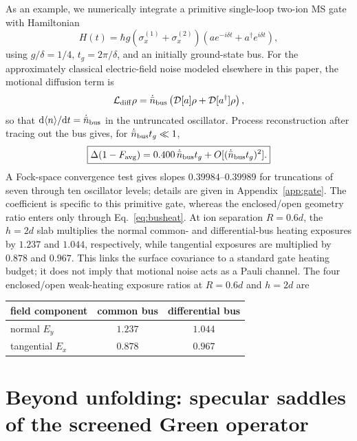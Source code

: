 \documentclass[aps,pra,twocolumn,superscriptaddress,longbibliography,nofootinbib,floatfix]{revtex4-2}
\theoremstyle{remark}
\newcommand{\dd}{\mathrm d}
\begin{document}
As an example, we numerically integrate a primitive single-loop two-ion MS gate with Hamiltonian
\begin{equation}
H(t)=\hbar g(\sigma_x^{(1)}+\sigma_x^{(2)})
(ae^{-i\delta t}+a^\dagger e^{i\delta t}),
\end{equation}
using $g/\delta=1/4$, $t_g=2\pi/\delta$, and an initially ground-state bus.  For the approximately classical electric-field noise modeled elsewhere in this paper, the motional diffusion term is
\begin{equation}
\mathcal L_{\rm diff}\rho=\dot{\bar n}_{\rm bus}
\left(\mathcal D[a]\rho+\mathcal D[a^\dagger]\rho\right),
\end{equation}
so that $\dd\langle n\rangle/\dd t=\dot{\bar n}_{\rm bus}$ in the untruncated oscillator.  Process reconstruction after tracing out the bus gives, for $\dot{\bar n}_{\rm bus}t_g\ll1$,
\begin{equation}
\boxed{\Delta(1-F_{\rm avg})=0.400\,\dot{\bar n}_{\rm bus}t_g
+O[(\dot{\bar n}_{\rm bus}t_g)^2].}
\label{eq:MSheat}
\end{equation}
A Fock-space convergence test gives slopes $0.39984$--$0.39989$ for truncations of seven through ten oscillator levels; details are given in Appendix~\ref{app:gate}.  The coefficient is specific to this primitive gate, whereas the enclosed/open geometry ratio enters only through Eq.~\eqref{eq:busheat}.  At ion separation $R=0.6d$, the $h=2d$ slab multiplies the normal common- and differential-bus heating exposures by $1.237$ and $1.044$, respectively, while tangential exposures are multiplied by $0.878$ and $0.967$.  This links the surface covariance to a standard gate heating budget; it does not imply that motional noise acts as a Pauli channel.  The four enclosed/open weak-heating exposure ratios at $R=0.6d$ and $h=2d$ are
\begin{center}
\small
\begin{tabular}{lcc}
\toprule
field component & common bus & differential bus\\
\midrule
normal $E_y$ & $1.237$ & $1.044$\\
tangential $E_x$ & $0.878$ & $0.967$\\
\bottomrule
\end{tabular}
\end{center}

\section{Beyond unfolding: specular saddles of the screened Green operator}
\label{sec:saddles}
\end{document}
